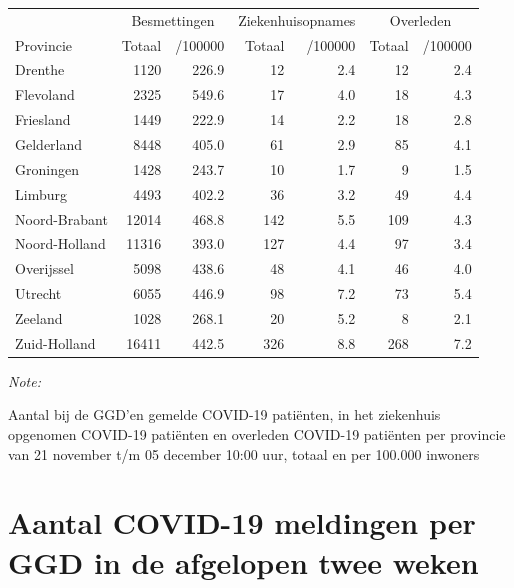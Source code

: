 \documentclass[
  english,
  man,floatsintext]{apa6}
\begin{document}
\begin{table}[H]
\centering
\begin{threeparttable}
\begin{tabular}{lrrrrrr}
\toprule
\multicolumn{1}{c}{ } & \multicolumn{2}{c}{Besmettingen} & \multicolumn{2}{c}{Ziekenhuisopnames} & \multicolumn{2}{c}{Overleden} \\
\cmidrule(l{3pt}r{3pt}){2-3} \cmidrule(l{3pt}r{3pt}){4-5} \cmidrule(l{3pt}r{3pt}){6-7}
Provincie & Totaal & /100000 & Totaal & /100000 & Totaal & /100000\\
\midrule
Drenthe & 1120 & 226.9 & 12 & 2.4 & 12 & 2.4\\
Flevoland & 2325 & 549.6 & 17 & 4.0 & 18 & 4.3\\
Friesland & 1449 & 222.9 & 14 & 2.2 & 18 & 2.8\\
Gelderland & 8448 & 405.0 & 61 & 2.9 & 85 & 4.1\\
Groningen & 1428 & 243.7 & 10 & 1.7 & 9 & 1.5\\
Limburg & 4493 & 402.2 & 36 & 3.2 & 49 & 4.4\\
Noord-Brabant & 12014 & 468.8 & 142 & 5.5 & 109 & 4.3\\
Noord-Holland & 11316 & 393.0 & 127 & 4.4 & 97 & 3.4\\
Overijssel & 5098 & 438.6 & 48 & 4.1 & 46 & 4.0\\
Utrecht & 6055 & 446.9 & 98 & 7.2 & 73 & 5.4\\
Zeeland & 1028 & 268.1 & 20 & 5.2 & 8 & 2.1\\
Zuid-Holland & 16411 & 442.5 & 326 & 8.8 & 268 & 7.2\\
\bottomrule
\end{tabular}
\begin{tablenotes}
\item \textit{Note: } 
\item Aantal bij de GGD’en gemelde COVID-19 patiënten, in het ziekenhuis opgenomen COVID-19 patiënten en overleden COVID-19 patiënten per provincie van 21 november t/m 05 december 10:00 uur, totaal en per 100.000 inwoners
\end{tablenotes}
\end{threeparttable}
\end{table}

\newpage

\hypertarget{aantal-covid-19-meldingen-per-ggd-in-de-afgelopen-twee-weken}{%
\section{Aantal COVID-19 meldingen per GGD in de afgelopen twee weken}\label{aantal-covid-19-meldingen-per-ggd-in-de-afgelopen-twee-weken}}
\end{document}
